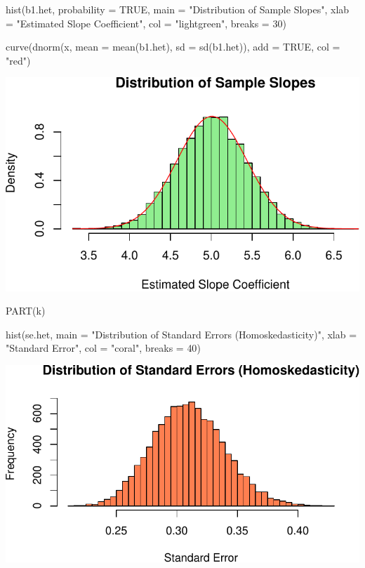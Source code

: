 \documentclass[
  11pt,
]{article}
\newenvironment{Shaded}{\begin{snugshade}}{\end{snugshade}}
\newcommand{\AttributeTok}[1]{\textcolor[rgb]{0.40,0.45,0.13}{#1}}
\newcommand{\ConstantTok}[1]{\textcolor[rgb]{0.56,0.35,0.01}{#1}}
\newcommand{\DecValTok}[1]{\textcolor[rgb]{0.68,0.00,0.00}{#1}}
\newcommand{\FunctionTok}[1]{\textcolor[rgb]{0.28,0.35,0.67}{#1}}
\newcommand{\NormalTok}[1]{\textcolor[rgb]{0.00,0.23,0.31}{#1}}
\newcommand{\StringTok}[1]{\textcolor[rgb]{0.13,0.47,0.30}{#1}}
\begin{document}
\begin{Shaded}
\begin{Highlighting}[]
\FunctionTok{hist}\NormalTok{(b1.het, }\AttributeTok{probability =} \ConstantTok{TRUE}\NormalTok{, }\AttributeTok{main =} \StringTok{"Distribution of Sample Slopes"}\NormalTok{, }\AttributeTok{xlab =} \StringTok{"Estimated Slope Coefficient"}\NormalTok{, }\AttributeTok{col =} \StringTok{"lightgreen"}\NormalTok{, }\AttributeTok{breaks =} \DecValTok{30}\NormalTok{)}

\FunctionTok{curve}\NormalTok{(}\FunctionTok{dnorm}\NormalTok{(x, }\AttributeTok{mean =} \FunctionTok{mean}\NormalTok{(b1.het), }\AttributeTok{sd =} \FunctionTok{sd}\NormalTok{(b1.het)), }\AttributeTok{add =} \ConstantTok{TRUE}\NormalTok{, }\AttributeTok{col =} \StringTok{"red"}\NormalTok{)}
\end{Highlighting}
\end{Shaded}

\includegraphics{HW-4-CODE-and-ANSWERS_files/figure-pdf/unnamed-chunk-19-1.pdf}

PART(k)

\begin{Shaded}
\begin{Highlighting}[]
\FunctionTok{hist}\NormalTok{(se.het, }\AttributeTok{main =} \StringTok{"Distribution of Standard Errors (Homoskedasticity)"}\NormalTok{, }\AttributeTok{xlab =} \StringTok{"Standard Error"}\NormalTok{, }\AttributeTok{col =} \StringTok{"coral"}\NormalTok{, }\AttributeTok{breaks =} \DecValTok{40}\NormalTok{)}
\end{Highlighting}
\end{Shaded}

\includegraphics{HW-4-CODE-and-ANSWERS_files/figure-pdf/unnamed-chunk-20-1.pdf}
\end{document}
